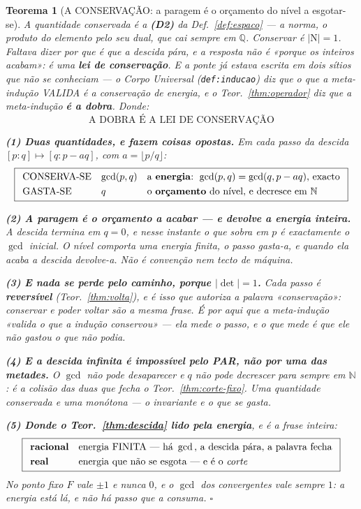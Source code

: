 \documentclass[11pt,a4paper]{article}
\newtheorem{teorema}{Teorema}
\newcommand{\code}[1]{\texttt{\small #1}}
\newcommand{\abs}[1]{\lvert #1\rvert}
\begin{document}
\begin{teorema}[A CONSERVAÇÃO: a paragem é o orçamento do nível a esgotar-se]\label{thm:conservacao}
\emph{A quantidade conservada é a} \textbf{(D2)} \emph{da Def.~\ref{def:espaco}} --- a
norma, o produto do elemento pelo seu dual, que cai sempre em $\mathbb{Q}$. Conservar é
$\abs{\mathrm{N}}=1$.
Faltava dizer \emph{por que} é que a descida pára, e a resposta não é «porque os inteiros
acabam»: é uma \textbf{lei de conservação}. E a ponte já estava escrita em dois sítios que
não se conheciam --- o \emph{Corpo Universal} (\code{def:inducao}) diz que \emph{o que
a meta-indução VALIDA é a conservação de energia}, e o Teor.~\ref{thm:operador} diz que a
meta-indução \textbf{é a dobra}. Donde:
\[
\boxed{\;\text{A DOBRA É A LEI DE CONSERVAÇÃO}\;}
\]

\textbf{(1) Duas quantidades, e fazem coisas opostas.} Em cada passo da descida
$[p{:}q]\mapsto[q:p-aq]$, com $a=\lfloor p/q\rfloor$:
\[
\boxed{
\begin{array}{lll}
\text{CONSERVA-SE} & \gcd(p,q) & \text{a \textbf{energia}: }\gcd(p,q)=\gcd(q,p-aq)\text{,
exacto}\\[3pt]
\text{GASTA-SE} & q & \text{o \textbf{orçamento} do nível, e decresce em }\mathbb{N}
\end{array}}
\]

\textbf{(2) A paragem é o orçamento a acabar --- e devolve a energia inteira.} A descida
termina em $q=0$, e nesse instante o que sobra em $p$ é \emph{exactamente} o
$\gcd$ inicial. \emph{O nível comporta uma energia finita, o passo gasta-a, e quando ela
acaba a descida devolve-a.} Não é convenção nem tecto de máquina.

\textbf{(3) E nada se perde pelo caminho, porque $\abs{\det}=1$.} Cada passo é
\textbf{reversível} (Teor.~\ref{thm:volta}), e é isso que autoriza a palavra
«conservação»: \emph{conservar e poder voltar são a mesma frase}. É por aqui que a
meta-indução «valida o que a indução conservou» --- ela mede o passo, e o que mede é que
ele não gastou o que não podia.

\textbf{(4) E a descida infinita é impossível pelo PAR, não por uma das metades.} O
$\gcd$ não pode desaparecer e $q$ não pode decrescer para sempre em $\mathbb{N}$: é a
colisão das duas que fecha o Teor.~\ref{thm:corte-fixo}. Uma quantidade conservada e uma
monótona --- \emph{o invariante e o que se gasta}.

\textbf{(5) Donde o Teor.~\ref{thm:descida} lido pela energia}, e é a frase inteira:
\[
\boxed{
\begin{array}{ll}
\text{\textbf{racional}} & \text{energia FINITA --- há }\gcd\text{, a descida pára, a
palavra fecha}\\[3pt]
\text{\textbf{real}} & \text{energia que não se esgota --- e é o \emph{corte}}
\end{array}}
\]
No ponto fixo $F$ vale $\pm1$ e nunca $0$, e o $\gcd$ dos convergentes vale sempre $1$:
\emph{a energia está lá, e não há passo que a consuma}. $\square$
\end{teorema}
\end{document}
